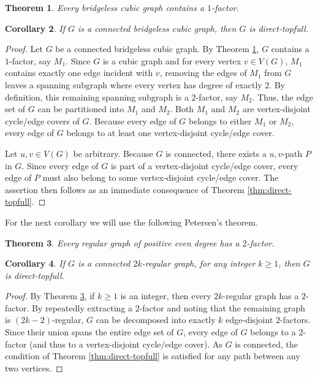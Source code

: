 \documentclass{article}
\newtheorem{theorem}{Theorem}[section]
\newtheorem{corollary}[theorem]{Corollary}
\begin{document}
\begin{theorem}\cite{petersen1891theorie,west2001introduction}\label{thm:petersen-cubic}
Every bridgeless cubic graph contains a $1$-factor.
\end{theorem}

\begin{corollary}
If $G$ is a connected bridgeless cubic graph, then $G$ is direct-topfull.
\end{corollary}
\begin{proof}
Let $G$ be a connected bridgeless cubic graph. By Theorem \ref{thm:petersen-cubic}, $G$ contains a $1$-factor, say $M_1$. Since $G$ is a cubic graph and for every vertex $v\in V(G)$, $M_1$ contains exactly one edge incident with $v$, removing the edges of $M_1$ from $G$ leaves a spanning subgraph where every vertex has degree of exactly $2$. By definition, this remaining spanning subgraph is a $2$-factor, say $M_2$. Thus, the edge set of $G$ can be partitioned into $M_1$ and $M_2$. Both $M_1$ and $M_2$ are vertex-disjoint cycle/edge covers of $G$. Because every edge of $G$ belongs to either $M_1$ or $M_2$, every edge of $G$ belongs to at least one vertex-disjoint cycle/edge cover. 

Let $u,v \in V(G)$ be arbitrary. Because $G$ is connected, there exists a $u,v$-path $P$ in $G$. Since every edge of $G$ is part of a vertex-disjoint cycle/edge cover, every edge of $P$ must also belong to some vertex-disjoint cycle/edge cover. The assertion then follows as an immediate consequence of Theorem \ref{thm:direct-topfull}.
\end{proof}

For the next corollary we will use the following Petersen's theorem.

\begin{theorem}\cite{petersen1891theorie,west2001introduction}\label{thm:petersen-2factor}
Every regular graph of positive even degree has a $2$-factor.
\end{theorem}

\begin{corollary}
If $G$ is a connected $2k$-regular graph, for any integer $k \geq 1$, then $G$ is direct-topfull.
\end{corollary}
\begin{proof}
By Theorem \ref{thm:petersen-2factor}, if $k\geq 1$ is an integer, then every $2k$-regular graph has a $2$-factor. By repeatedly extracting a $2$-factor and noting that the remaining graph is $(2k-2)$-regular, $G$ can be decomposed into exactly $k$ edge-disjoint $2$-factors. Since their union spans the entire edge set of $G$, every edge of $G$ belongs to a $2$-factor (and thus to a vertex-disjoint cycle/edge cover). As $G$ is connected, the condition of Theorem \ref{thm:direct-topfull} is satisfied for any path between any two vertices.
\end{proof}
\end{document}
